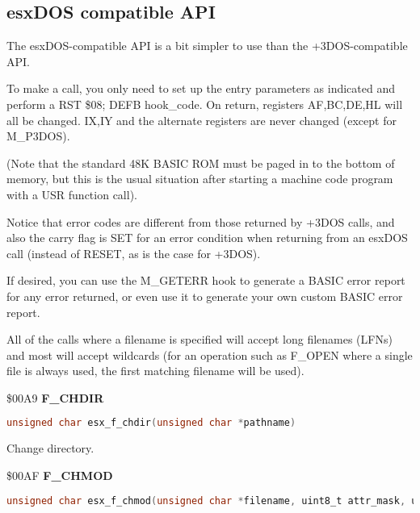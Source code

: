 \subsection{esxDOS compatible API}

The esxDOS-compatible API is a bit simpler to use than the
+3DOS-compatible API.

To make a call, you only need to set up the entry parameters as
indicated and perform a RST \$08; DEFB hook\_code. On return, registers
AF,BC,DE,HL will all be changed. IX,IY and the alternate registers are
never changed (except for M\_P3DOS).

(Note that the standard 48K BASIC ROM must be paged in to the bottom
of memory, but this is the usual situation after starting a machine
code program with a USR function call).

Notice that error codes are different from those returned by +3DOS
calls, and also the carry flag is SET for an error condition when
returning from an esxDOS call (instead of RESET, as is the case for
+3DOS).

If desired, you can use the M\_GETERR hook to generate a BASIC error
report for any error returned, or even use it to generate your own
custom BASIC error report.

All of the calls where a filename is specified will accept long
filenames (LFNs) and most will accept wildcards (for an operation such
as F\_OPEN where a single file is always used, the first matching
filename will be used).

\$00A9 \textbf{F\_CHDIR}

\begin{lstlisting}[language=C]
unsigned char esx_f_chdir(unsigned char *pathname)
\end{lstlisting}

Change directory.


\$00AF \textbf{F\_CHMOD}

\begin{lstlisting}[language=C]
unsigned char esx_f_chmod(unsigned char *filename, uint8_t attr_mask, uint8_t attr)
\end{lstlisting}

